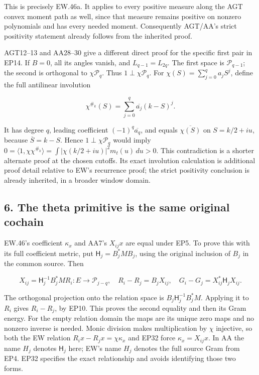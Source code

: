 This is precisely EW.46a. It applies to every positive measure along the AGT convex moment path as well, since that measure remains positive on nonzero polynomials and has every needed moment. Consequently AGT/AA's strict positivity statement already follows from the inherited proof.

AGT12--13 and AA28--30 give a different direct proof for the specific first pair in EP14. If \(B=0\), all its angles vanish, and \(L_{q-1}=L_{2q}\). The first space is \(\mathcal P_{q-1}\); the second is orthogonal to \(\chi\mathcal P_q\). Thus \(1\perp\chi\mathcal P_q\). For \(\chi(S)=\sum_{j=0}^q a_jS^j\), define the full antilinear involution

\[
\chi^{\#_k}(S)=\sum_{j=0}^q\overline{a_j}(k-S)^j.
\tag{EP31}
\]

It has degree \(q\), leading coefficient \((-1)^q\overline{a_q}\), and equals \(\overline{\chi(S)}\) on \(S=k/2+iu\), because \(\overline S=k-S\). Hence \(1\perp\chi\mathcal P_q\) would imply \(0=\langle1,\chi\chi^{\#_k}\rangle=\int|\chi(k/2+iu)|^2m_t(u)\,du>0\). This contradiction is a shorter alternate proof at the chosen cutoffs. Its exact involution calculation is additional proof detail relative to EW's recurrence proof; the strict positivity conclusion is already inherited, in a broader window domain.

\subsection{6. The theta primitive is the same original cochain}\label{GraphV2:the-theta-primitive-is-the-same-original-cochain}

EW.46's coefficient \(\kappa_x\) and AA7's \(X_{ij}x\) are equal under EP5. To prove this with its full coefficient metric, put \(\mathsf H_j=B_j^*MB_j\), using the original inclusion of \(B_j\) in the common source. Then

\[
X_{ij}=\mathsf H_j^{-1}B_j^*MR_i:E\to\mathcal P_{j-q},\quad
R_i-R_j=B_jX_{ij},\quad
G_i-G_j=X_{ij}^*\mathsf H_jX_{ij}.
\tag{EP32}
\]

The orthogonal projection onto the relation space is \(B_j\mathsf H_j^{-1}B_j^*M\). Applying it to \(R_i\) gives \(R_i-R_j\), by EP10. This proves the second equality and then its Gram energy. For the empty relation domain the maps are its unique zero maps and no nonzero inverse is needed. Monic division makes multiplication by \(\chi\) injective, so both the EW relation \(R_ix-R_jx=\chi\kappa_x\) and EP32 force \(\kappa_x=X_{ij}x\). In AA the name \(H_j\) denotes \(\mathsf H_j\) here; EW's name \(H_j\) denotes the full source Gram from EP4. EP32 specifies the exact relationship and avoids identifying those two forms.


